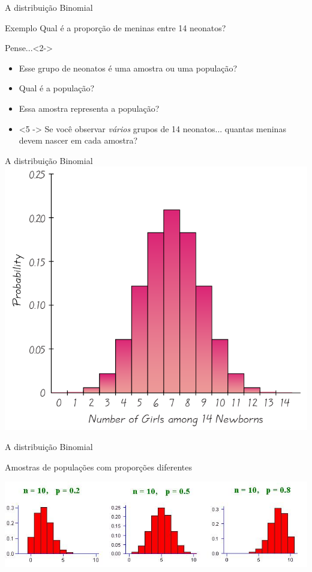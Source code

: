 \documentclass{beamer}
\begin{document}
\begin{frame}{A distribuição Binomial}
  \begin{exampleblock}{Exemplo}
    Qual é a proporção de meninas entre 14 neonatos?
  \end{exampleblock}
  \begin{block}{Pense...}<2->
    \begin{itemize}
    \item Esse grupo de neonatos é uma amostra ou uma população?
    \item<3-> Qual é a população?
    \item<4-> Essa amostra \alert{representa} a população?
    \item<5
      -> Se você observar {\em vários} grupos de 14 neonatos... quantas meninas devem nascer em cada amostra?
    \end{itemize}
  \end{block}

\end{frame}

\begin{frame}{A distribuição Binomial}
  \includegraphics[height=\textheight]{Cap2/discreta}
\end{frame}


\begin{frame}{A distribuição Binomial}
  \begin{block}{}
    Amostras de populações com proporções diferentes
  \end{block}

  \includegraphics[width=\textwidth]{Cap2/binomial}
\end{frame}
\end{document}
